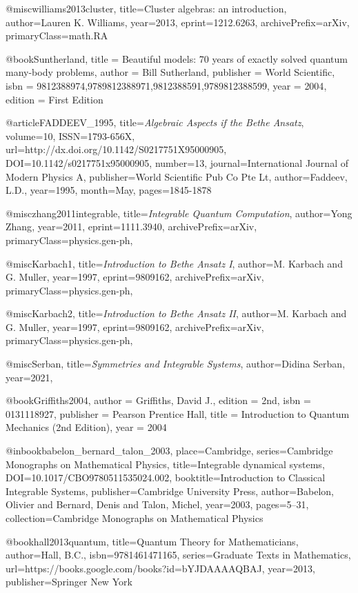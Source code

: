 @misc{williams2013cluster,
	title={Cluster algebras: an introduction}, 
	author={Lauren K. Williams},
	year={2013},
	eprint={1212.6263},
	archivePrefix={arXiv},
	primaryClass={math.RA}
}



@book{Suntherland,
	title =     {Beautiful models: 70 years of exactly solved quantum many-body problems},
	author =    {Bill Sutherland},
	publisher = {World Scientific},
	isbn =      {9812388974,9789812388971,9812388591,9789812388599},
	year =      {2004},
	edition =   {First Edition}
}


@article{FADDEEV_1995,
	title={\textit{Algebraic Aspects if the Bethe Ansatz}},
	volume={10},
	ISSN={1793-656X},
	url={http://dx.doi.org/10.1142/S0217751X95000905},
	DOI={10.1142/s0217751x95000905},
	number={13},
	journal={\textnormal{International Journal of Modern Physics A}},
	publisher={World Scientific Pub Co Pte Lt},
	author={Faddeev, L.D.},
	year={1995},
	month={May},
	pages={1845-1878}
}


@misc{zhang2011integrable,
	title={\textit{Integrable Quantum Computation}},
	author={Yong Zhang},
	year={2011},
	eprint={1111.3940},
	archivePrefix={arXiv},
	primaryClass={physics.gen-ph},
}


@misc{Karbach1,
	title={\textit{Introduction to Bethe Ansatz I}}, 
	author={M. Karbach and G. Muller},
	year={1997},
	eprint={9809162},
	archivePrefix={arXiv},
	primaryClass={physics.gen-ph},
}

@misc{Karbach2,
	title={\textit{Introduction to Bethe Ansatz II}}, 
	author={M. Karbach and G. Muller},
	year={1997},
	eprint={9809162},
	archivePrefix={arXiv},
	primaryClass={physics.gen-ph},
}

@misc{Serban,
	title={\textit{Symmetries and Integrable Systems}}, 
	author={Didina Serban},
	year={2021},
}

@book{Griffiths2004,
	author = {Griffiths, David J.},
	edition = {2nd},
	isbn = {0131118927},
	publisher = {Pearson Prentice Hall},
	title = {Introduction to Quantum Mechanics (2nd Edition)},
	year = 2004
}

@inbook{babelon_bernard_talon_2003, 
	place={Cambridge}, 
	series={Cambridge Monographs on Mathematical Physics}, 
	title={Integrable dynamical systems}, DOI={10.1017/CBO9780511535024.002}, booktitle={Introduction to Classical Integrable Systems}, publisher={Cambridge University Press}, author={Babelon, Olivier and Bernard, Denis and Talon, Michel}, year={2003}, pages={5–31}, collection={Cambridge Monographs on Mathematical Physics}
}

@book{hall2013quantum,
	title={Quantum Theory for Mathematicians},
	author={Hall, B.C.},
	isbn={9781461471165},
	series={Graduate Texts in Mathematics},
	url={https://books.google.com/books?id=bYJDAAAAQBAJ},
	year={2013},
	publisher={Springer New York}
}
